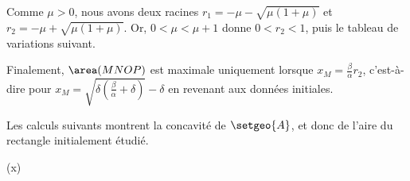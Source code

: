 Comme $\mu > 0$, nous avons deux racines
$r_1 = - \mu - \sqrt{\mu (1 + \mu)}$
et
$r_2 = - \mu + \sqrt{\mu (1 + \mu)}$.
Or,
$0 < \mu < \mu + 1$
donne
$0 < r_2 < 1$,
puis
le tableau de variations suivant.
%
\begin{center}
\end{center}


Finalement,
$\area(MNOP)$ est maximale uniquement lorsque 
$x_M = \frac{\beta}{\alpha} r_2$,
c'est-à-dire pour %
$x_M = \sqrt{\delta (\frac{\beta}{\alpha} +  \delta)} - \delta$
en revenant aux données initiales.


\begin{remark}
	Les calculs suivants montrent la concavité de $\setgeo{A}$, et donc de l'aire du rectangle initialement étudié.

	\begin{stepcalc}[style=sar]
    	(x)
    \explnext{}
    \explnext{}
    \explnext{}
    \end{stepcalc}
\end{remark}
